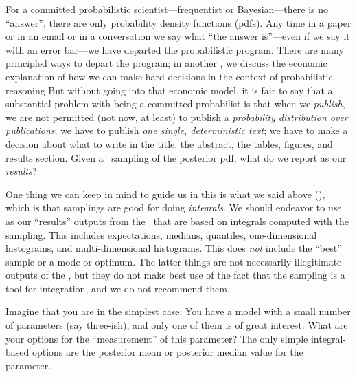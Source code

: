 \documentclass[12pt,twoside,pdftex]{article}
\newcommand{\MCMC}{\acronym{MCMC}}
\begin{document}
For a committed probabilistic scientist---frequentist or
Bayesian---there is no ``answer'', there are only probability density
functions (pdfs).  Any time in a paper or in an email or in a conversation
we say what ``the answer is''---even if we say it with an error
bar---we have departed the probabilistic program.  There are many
principled ways to depart the program; in another \documentname, we
discuss the economic explanation of how we can make hard decisions in
the context of probabilistic reasoning
But without going into that economic model, it is fair to say that a
substantial problem with being a committed probabilist is that when we
\emph{publish}, we are not permitted (not now, at least) to publish a
\emph{probability distribution over publications}; we have to publish
\emph{one single, deterministic text}; we have to make a decision about what
to write in the title, the abstract, the tables, figures, and results
section.  Given a \MCMC\ sampling of the posterior pdf, what do we
report as our \emph{results}?

One thing we can keep in mind to guide us in this is what we said above (),
  which is that samplings are good for doing \emph{integrals}.
We should endeavor to use as our ``results'' outputs from the \MCMC\ 
  that are based on integrals computed with the sampling.
This includes expectations, medians, quantiles, one-dimensional histograms,
  and multi-dimensional histograms.
This does \emph{not} include the ``best'' sample or a mode or optimum.
The latter things are not necessarily illegitimate outputs of the \MCMC,
  but they do not make best use of the fact that the sampling is a tool for integration,
  and we do not recommend them.

Imagine that you are in the simplest case:
You have a model with a small number of parameters (say three-ish),
  and only one of them is of great interest.
What are your options for the ``measurement'' of this parameter?
The only simple integral-based options are the posterior mean
  or posterior median value for the parameter.
\end{document}
